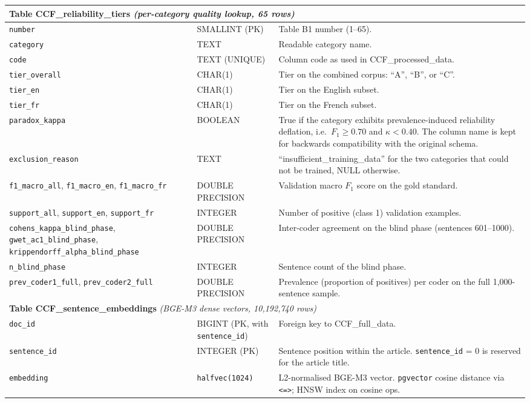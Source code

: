 \begin{longtable}{p{3.6cm}p{2.4cm}p{16.5cm}}
\multicolumn{3}{l}{\cellcolor{gray!12}\textbf{Table CCF\_reliability\_tiers} \emph{(per-category quality lookup, 65 rows)}} \\
\midrule
\texttt{number}                       & SMALLINT (PK)     & Table B1 number (1--65). \\
\texttt{category}                     & TEXT              & Readable category name. \\
\texttt{code}                         & TEXT (UNIQUE)     & Column code as used in CCF\_processed\_data. \\
\texttt{tier\_overall}                & CHAR(1)           & Tier on the combined corpus: ``A'', ``B'', or ``C''. \\
\texttt{tier\_en}                     & CHAR(1)           & Tier on the English subset. \\
\texttt{tier\_fr}                     & CHAR(1)           & Tier on the French subset. \\
\texttt{paradox\_kappa}               & BOOLEAN           & True if the category exhibits prevalence-induced reliability deflation, i.e.\ $F_1 \geq 0.70$ and $\kappa < 0.40$. The column name is kept for backwards compatibility with the original schema. \\
\texttt{exclusion\_reason}            & TEXT              & ``insufficient\_training\_data'' for the two categories that could not be trained, NULL otherwise. \\
\texttt{f1\_macro\_all}, \texttt{f1\_macro\_en}, \texttt{f1\_macro\_fr} & DOUBLE PRECISION & Validation macro $F_1$ score on the gold standard. \\
\texttt{support\_all}, \texttt{support\_en}, \texttt{support\_fr}      & INTEGER          & Number of positive (class 1) validation examples. \\
\texttt{cohens\_kappa\_blind\_phase}, \texttt{gwet\_ac1\_blind\_phase}, \texttt{krippendorff\_alpha\_blind\_phase} & DOUBLE PRECISION & Inter-coder agreement on the blind phase (sentences 601--1000). \\
\texttt{n\_blind\_phase}              & INTEGER           & Sentence count of the blind phase. \\
\texttt{prev\_coder1\_full}, \texttt{prev\_coder2\_full} & DOUBLE PRECISION & Prevalence (proportion of positives) per coder on the full 1{,}000-sentence sample. \\
\midrule

\multicolumn{3}{l}{\cellcolor{gray!12}\textbf{Table CCF\_sentence\_embeddings} \emph{(BGE-M3 dense vectors, 10{,}192{,}740 rows)}} \\
\midrule
\texttt{doc\_id}     & BIGINT (PK, with \texttt{sentence\_id}) & Foreign key to CCF\_full\_data. \\
\texttt{sentence\_id} & INTEGER (PK)   & Sentence position within the article. \texttt{sentence\_id} = 0 is reserved for the article title. \\
\texttt{embedding}   & \texttt{halfvec(1024)} & L2-normalised BGE-M3 vector. \texttt{pgvector} cosine distance via \texttt{<=>}; HNSW index on cosine ops. \\

\end{longtable}
